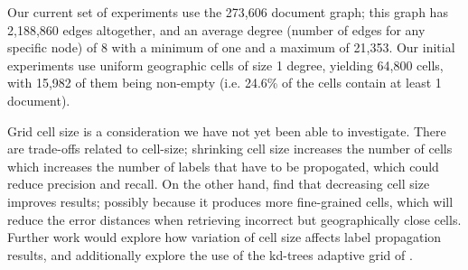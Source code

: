 \par %
Our current set of experiments use the 273,606
document graph; this graph has  2,188,860 edges altogether, and an average
degree (number of edges for any  specific node) of 8 with a minimum of one and
a maximum of 21,353. Our initial  experiments use uniform geographic cells of
size 1 degree, yielding 64,800  cells, with 15,982 of them being non-empty
(i.e. 24.6\% of the cells contain at  least 1 document).

\par
Grid cell size is a consideration we have not yet been able to investigate.
There are trade-offs related to cell-size; shrinking cell size increases the
number of cells which increases the number of labels that have to be
propogated, which could reduce precision and recall. On the other hand,
\cite{wing-baldridge:11} find that decreasing cell size improves results;
possibly because it produces more fine-grained cells, which will reduce the
error distances when retrieving incorrect but geographically close cells.
Further work would explore how variation of cell size affects label propagation
results, and additionally explore the use of the kd-trees adaptive grid of
\cite{rolleretal:12}.


